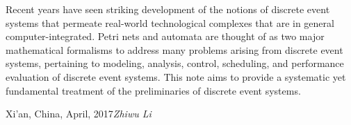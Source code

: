 %
%

\foreword



Recent years have seen striking development of the notions of discrete event systems that permeate real-world technological complexes that are in general computer-integrated. Petri nets and automata are thought of as two major mathematical formalisms to address many problems arising from discrete event systems, pertaining to modeling, analysis, control, scheduling, and performance evaluation of discrete event systems. This note aims to provide a systematic yet fundamental treatment of the preliminaries of discrete event systems.

\vspace{\baselineskip}
\begin{flushright}\noindent
Xi'an, China, April, 2017\hfill {\it Zhiwu Li}\\
\end{flushright}


